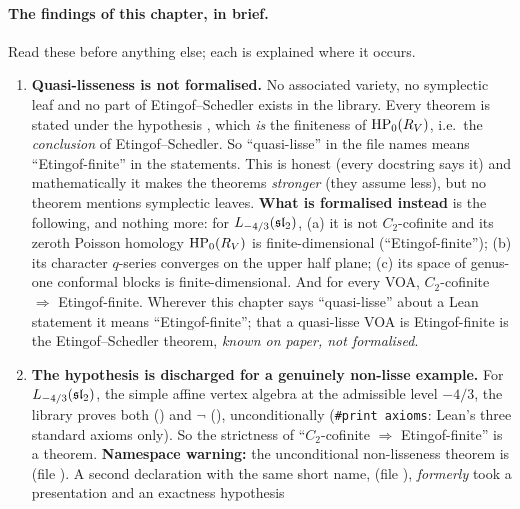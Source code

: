 \paragraph{The findings of this chapter, in brief.} Read these before anything else; each is
explained where it occurs.
\begin{enumerate}
\item \textbf{Quasi-lisseness is not formalised.} No associated variety, no symplectic leaf and no
  part of Etingof--Schedler exists in the library. Every theorem is stated under the hypothesis
  , which \emph{is} the finiteness of $\mathrm{HP}_0(R_V)$, i.e.\ the
  \emph{conclusion} of Etingof--Schedler. So ``quasi-lisse'' in the file names means ``Etingof-finite''
  in the statements. This is honest (every docstring says it) and mathematically it makes the
  theorems \emph{stronger} (they assume less), but no theorem mentions symplectic leaves.
  \textbf{What is formalised instead} is the following, and nothing more: for
  $L_{-4/3}(\mathfrak{sl}_2)$, (a) it is not $C_2$-cofinite and its zeroth Poisson homology $\mathrm{HP}_0(R_V)$ is
  finite-dimensional (``Etingof-finite''); (b) its character $q$-series converges on the upper half plane; (c) its
  space of genus-one conformal blocks is finite-dimensional. And for every VOA, $C_2$-cofinite $\Rightarrow$
  Etingof-finite. Wherever this chapter says ``quasi-lisse'' about a Lean statement it means ``Etingof-finite''; that a
  quasi-lisse VOA is Etingof-finite is the Etingof--Schedler theorem, \emph{known on paper, not formalised}.
\item \textbf{The hypothesis is discharged for a genuinely non-lisse example.} For
  $L_{-4/3}(\mathfrak{sl}_2)$, the simple affine vertex algebra at the admissible level $-4/3$, the
  library proves both  (\allowbreak{}\allowbreak{}) and
  $\neg$ (\allowbreak{}\allowbreak{}), unconditionally
  (\texttt{\#print axioms}: Lean's three standard axioms only). So the strictness of ``$C_2$-cofinite $\Rightarrow$ Etingof-finite'' is a
  theorem. \textbf{Namespace warning:} the unconditional non-lisseness theorem is
  \allowbreak{}\allowbreak{} (file ). A
  second declaration with the same short name, \allowbreak{}\allowbreak{}
  (file ), \emph{formerly} took a presentation  and an exactness hypothesis

\end{enumerate}
